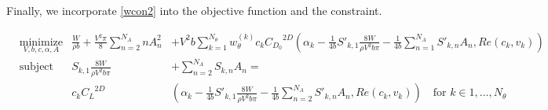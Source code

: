 \documentclass[letterpaper,12pt]{article}
\begin{document}


Finally, we incorporate \ref{wcon2} into the objective function and the constraint.

\begin{align*}
	& \underset{V, b, c, \alpha, A}{\text{minimize}} &
	\frac{W}{\rho b} + \frac{V^2 \pi}{8}\sum_{n=2}^{N_A} n A_{n}^2 &+
	  V^2 b  \sum_{k=1}^{N_{\theta}} w_{\theta}^{(k)} c_k {C_{D_0}}^{2D}
	  \left( \alpha_k
	  - \frac {1}{4b} S'_{k,1}\frac{8W}{\rho V^2 b \pi}
	  - \frac {1}{4b}\sum_{n=1}^{N_{A}}S'_{k,n}A_n , Re(c_k, v_k)
	  \right)\\
	& \text{subject to} &
 	S_{k, 1} \frac{8W}{\rho V^2 b \pi} &+ \sum_{n=2}^{N_{A}} S_{k,n} A_n = \\
	& & c_k{C_L}^{2D} & \left( \alpha_k
		 - \frac {1}{4b} S'_{k,1}\frac{8W}{\rho V^2 b \pi}
		 - \frac {1}{4b}\sum_{n=2}^{N_{A}}S'_{k,n}A_n , Re(c_k, v_k)\right)
		 \quad \text{for } k \in 1,\dots, N_{\theta}
\end{align*}
\end{document}
